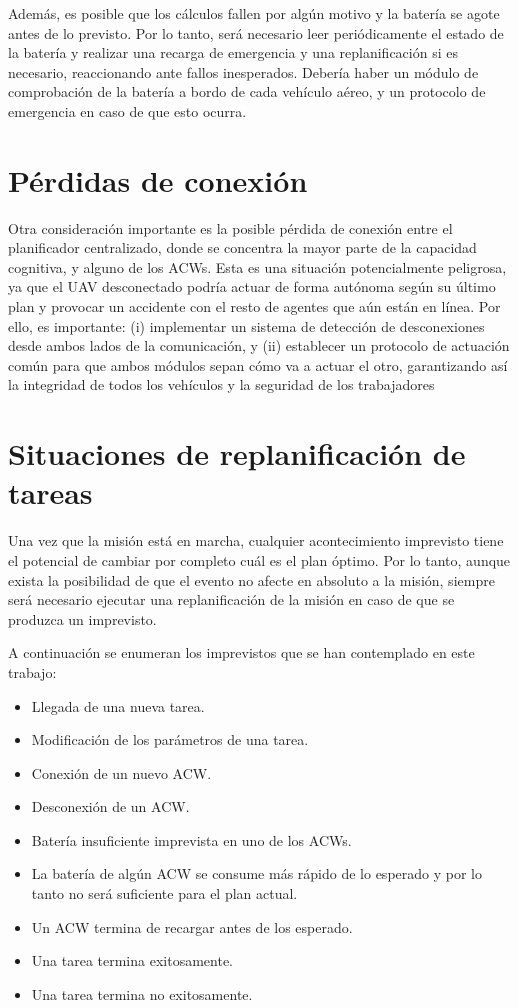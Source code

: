 \documentclass[fontsize=11pt, English=false, Español=true, Myfinal=true, twoside, numbers=noenddot]{scrbook}
\begin{document}
Además, es posible que los cálculos fallen por algún motivo y la batería se agote antes de lo previsto. Por lo tanto, será necesario leer periódicamente el estado de la batería y realizar una recarga de emergencia y una replanificación si es necesario, reaccionando ante fallos inesperados. Debería haber un módulo de comprobación de la batería a bordo de cada vehículo aéreo, y un protocolo de emergencia en caso de que esto ocurra.

\section{Pérdidas de conexión}
\label{sec:ConnectionLosses}
Otra consideración importante es la posible pérdida de conexión entre el planificador centralizado, donde se concentra la mayor parte de la capacidad cognitiva, y alguno de los \glspl{ACW}. Esta es una situación potencialmente peligrosa, ya que el \gls{UAV} desconectado podría actuar de forma autónoma según su último plan y provocar un accidente con el resto de agentes que aún están en línea. Por ello, es importante: (i) implementar un sistema de detección de desconexiones desde ambos lados de la comunicación, y (ii) establecer un protocolo de actuación común para que ambos módulos sepan cómo va a actuar el otro, garantizando así la integridad de todos los vehículos y la seguridad de los trabajadores

\section{Situaciones de replanificación de tareas}
\label{sec:TaskReplanningSituations}
Una vez que la misión está en marcha, cualquier acontecimiento imprevisto tiene el potencial de cambiar por completo cuál es el plan óptimo. Por lo tanto, aunque exista la posibilidad de que el evento no afecte en absoluto a la misión, siempre será necesario ejecutar una replanificación de la misión en caso de que se produzca un imprevisto.

A continuación se enumeran los imprevistos que se han contemplado en este trabajo:

\begin{itemize}
    \item Llegada de una nueva tarea.
    \item Modificación de los parámetros de una tarea.
    \item Conexión de un nuevo \gls{ACW}.
    \item Desconexión de un \gls{ACW}.
    \item Batería insuficiente imprevista en uno de los \glspl{ACW}.
    \item La batería de algún \gls{ACW} se consume más rápido de lo esperado y por lo tanto no será suficiente para el plan actual.
    \item Un \gls{ACW} termina de recargar antes de los esperado.
    \item Una tarea termina exitosamente.
    \item Una tarea termina no exitosamente.
\end{itemize}
\end{document}
